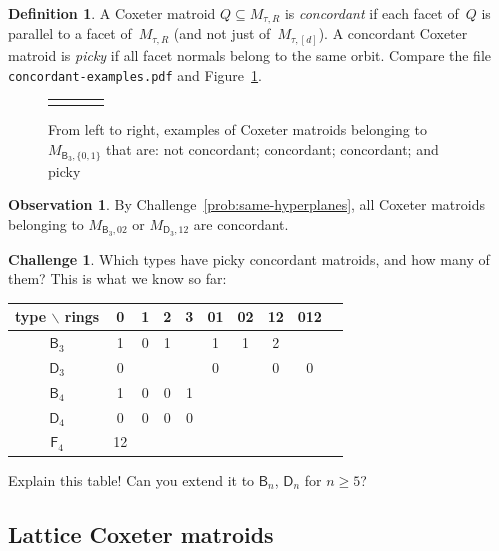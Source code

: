 \documentclass[11pt]{amsart}
\newcommand\BB{{\mathsf B}}
\newcommand\DD{{\mathsf D}}
\newcommand\FF{{\mathsf F}}
\theoremstyle{definition}
\newtheorem{definition}[theorem]{Definition}
\newtheorem{observation}[theorem]{Observation}
\newtheorem{challenge}[theorem]{Challenge}
\begin{document}
\begin{definition}
  A Coxeter matroid $Q\subseteq M_{\tau,R}$ is \emph{concordant} if each facet of~$Q$ is parallel to a facet of~$M_{\tau,R}$ (and not just of~$M_{\tau,[d]}$).
  A concordant Coxeter matroid is \emph{picky} if all facet normals belong to the same orbit.
  Compare the file \texttt{concordant-examples.pdf} and Figure~\ref{fig:concordant}.
\end{definition}

\begin{figure}[htbp]
  \centering
  \begin{tabular}[c]{cccc}
    \mbox{}
    &
      \mbox{}
    &
      \mbox{}
    &
      \mbox{}
  \end{tabular}
  \caption{From left to right, examples of Coxeter matroids belonging to $M_{\BB_3,\{0,1\}}$ that are: not concordant; concordant; concordant; and picky}
  \label{fig:concordant}
\end{figure}

\begin{observation}
  By Challenge~\ref{prob:same-hyperplanes}, all Coxeter matroids belonging to $M_{\BB_3,02}$ or $M_{\DD_3,12}$ are concordant. 
\end{observation}

\begin{challenge}
  Which types have picky concordant matroids, and how many of them? This is what we know so far:
  \begin{center}
    \begin{tabular}[c]{c|ccccccccc}
      type $\backslash$ rings& 0 & 1 & 2 & 3 & 01 & 02 & 12 & 012\\\hline
      $\BB_3$     & 1 & 0 & 1 &   & 1  & 1  & 2  \\
      $\DD_3$     & 0 &   &   &   & 0  &    & 0  & 0 \\
      $\BB_4$     & 1 & 0 & 0 & 1\\
      $\DD_4$     & 0 & 0 & 0 & 0\\
      $\FF_4$     & 12
    \end{tabular}
  \end{center}
  Explain this table! Can you extend it to $\BB_n$, $\DD_n$ for $n\ge5$?
\end{challenge}

\subsection{Lattice Coxeter matroids}
\end{document}
